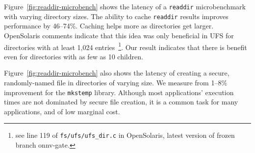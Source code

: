 Figure~\ref{fig:readdir-microbench} shows the latency 
of a {\tt readdir} microbenchmark with varying directory sizes.
The ability to cache {\tt readdir} results improves performance by 46--74\%.
Caching helps more as directories get larger.
OpenSolaris comments indicate that this idea was only beneficial 
in UFS for directories with at least 1,024 entries~\footnote{see line 119 of {\tt fs/ufs/ufs\_dir.c} in OpenSolaris, latest version of frozen branch onnv-gate.}.
Our result indicates that there is benefit even for directories with as few as 10 children.

Figure~\ref{fig:readdir-microbench} also shows 
the latency of creating a secure, randomly-named file in directories of varying size.
We measure from 1--8\% improvement for the {\tt mkstemp} library.
Although most applications' execution times are not dominated by secure file creation,
it is a common task for many applications, and of low marginal cost.


